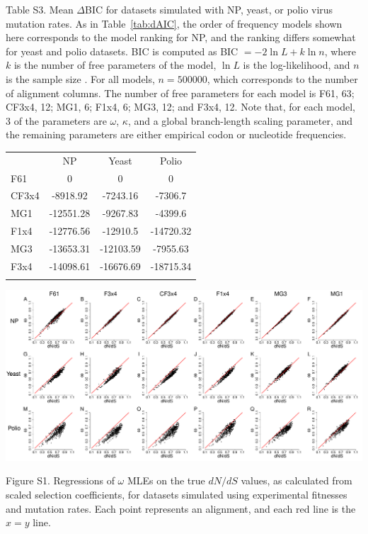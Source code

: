 \documentclass[11pt]{article}
\begin{document}
\vspace{2.5cm}


\noindent Table S3. Mean $\Delta$BIC for datasets simulated with NP, yeast, or polio virus mutation rates. As in Table~\ref{tab:dAIC}, the order of frequency models shown here corresponds to the model ranking for NP, and the ranking differs somewhat for yeast and polio datasets. BIC is computed as BIC $= -2\ln L + k\ln n$, where $k$ is the number of free parameters of the model, $\ln L$ is the log-likelihood, and $n$ is the sample size \citep{BurnhamAnderson2004}. For all models, $n=500000$, which corresponds to the number of alignment columns. The number of free parameters for each model is F61, 63; CF3x4, 12; MG1, 6; F1x4, 6; MG3, 12; and F3x4, 12. Note that, for each model, 3 of the parameters are $\omega$, $\kappa$, and a global branch-length scaling parameter, and the remaining parameters are either empirical codon or nucleotide frequencies.
\begin{table}[htbp]
	\begin{tabular}{l c c c}
		\hline\noalign{\smallskip}
		\multicolumn{1}{c}{Frequencies} & NP & Yeast & Polio \\
		\noalign{\smallskip}\hline\noalign{\smallskip}
            F61 & 0 & 0 & 0 \\ 
            CF3x4 & -8918.92 & -7243.16 & -7306.7 \\ 
            MG1 & -12551.28 & -9267.83 & -4399.6 \\ 
            F1x4 & -12776.56 & -12910.5 & -14720.32 \\ 
            MG3 & -13653.31 & -12103.59 & -7955.63 \\ 
            F3x4 & -14098.61 & -16676.69 & -18715.34 \\ 
		\noalign{\smallskip}\hline\noalign{\smallskip} 	
	\end{tabular}
\end{table}

\newpage

\begin{landscape}
	\includegraphics[width=9.5in]{figures/SI/nyp_regression.pdf}
	\vspace{0.5cm}
	
	Figure S1. Regressions of $\omega$ MLEs on the true $dN/dS$ values, as calculated from scaled selection coefficients, for datasets simulated using experimental fitnesses and mutation rates. Each point represents an alignment, and each red line is the $x=y$ line.
\end{landscape}
\end{document}
